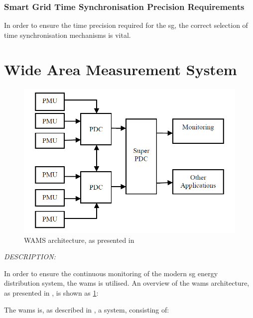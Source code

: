 \subsubsection[Smart Grid Time Sync Precision Requirements]{Smart Grid Time Synchronisation Precision Requirements}

In order to ensure the time precision required for the \acrshort{sg}, the correct selection of time synchronisation mechanisms is vital. 


\section{Wide Area Measurement System}
\begin{figure}[ht]
\includegraphics[width=\linewidth]{figures/Kumar-WAMS-architecture.png}
\caption[WAMS architecture]{WAMS architecture, as presented in \cite{kumar2015monitoring}}
\label{fig:Kumar-WAMS-architecture}
\end{figure}










\textit{DESCRIPTION:}
\textbf{\cite{kumar2015monitoring}  }


    

In order to ensure the continuous monitoring of the modern \acrlong{sg} energy distribution system, the \acrfull{wams} is utilised. An overview of the \acrshort{wams} architecture, as presented in   \cite{kumar2015monitoring}, is shown as \figureautorefname  { } \ref{fig:Kumar-WAMS-architecture}:

The \acrshort{wams} is, as described in  \cite{kumar2015monitoring}, a  system, consisting of:

